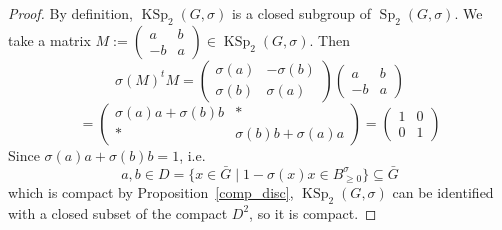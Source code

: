 \documentclass[10pt,a4paper]{amsart}
\DeclareMathOperator{\KSp}{KSp}
\DeclareMathOperator{\Sp}{Sp}
\begin{document}
\begin{proof} By definition, $\KSp_2(G,\sigma)$ is a closed subgroup of $\Sp_2(G,\sigma)$. We take a matrix $M:=\begin{pmatrix}
a & b \\
-b & a
\end{pmatrix}\in \KSp_2(G,\sigma)$.
Then
$$\sigma(M)^tM=\begin{pmatrix}
\sigma(a) & -\sigma(b) \\
\sigma(b) & \sigma(a)
\end{pmatrix}
\begin{pmatrix}
a & b \\
-b & a
\end{pmatrix}$$
$$=
\begin{pmatrix}
\sigma(a)a+\sigma(b)b & * \\
* & \sigma(b)b+\sigma(a)a
\end{pmatrix}=\begin{pmatrix}
1 & 0 \\
0 & 1
\end{pmatrix}$$
Since $\sigma(a)a+\sigma(b)b=1$, i.e.
$$a,b\in D=\{x\in \bar G\mid 1-\sigma(x)x\in B^{\sigma}_{\geq 0}\}\subseteq \bar G$$
which is compact by Proposition~\ref{comp_disc}, $\KSp_2(G,\sigma)$ can be identified with a closed subset of the compact $D^2$, so it is compact.


\end{proof}
\end{document}
